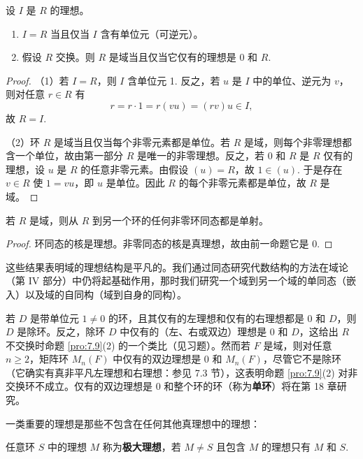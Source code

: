 \begin{proposition}\label{pro:7.9}
设 \(I\) 是 \(R\) 的理想。

\begin{enumerate}[label=(\arabic*)]
\item \(I = R\) 当且仅当 \(I\) 含有单位元（可逆元）。
\item 假设 \(R\) 交换。则 \(R\) 是域当且仅当它仅有的理想是 0 和 \(R\).
\end{enumerate}
\end{proposition}

\begin{proof}
（1）若 \(I = R\)，则 \(I\) 含单位元 1. 反之，若 \(u\) 是 \(I\) 中的单位、逆元为 \(v\)，则对任意 \(r \in R\) 有
\[
r = r\cdot 1 = r(vu) = (rv)u \in I,
\]
故 \(R = I\).

（2）环 \(R\) 是域当且仅当每个非零元素都是单位。若 \(R\) 是域，则每个非零理想都含一个单位，故由第一部分 \(R\) 是唯一的非零理想。反之，若 0 和 \(R\) 是 \(R\) 仅有的理想，设 \(u\) 是 \(R\) 的任意非零元素。由假设 \((u) = R\)，故 \(1 \in (u)\). 于是存在 \(v \in R\) 使 \(1 = vu\)，即 \(u\) 是单位。因此 \(R\) 的每个非零元素都是单位，故 \(R\) 是域。
\end{proof}

\begin{corollary}\label{cor:7.10}
若 \(R\) 是域，则从 \(R\) 到另一个环的任何非零环同态都是单射。
\end{corollary}

\begin{proof}
环同态的核是理想。非零同态的核是真理想，故由前一命题它是 0.
\end{proof}

这些结果表明域的理想结构是平凡的。我们通过同态研究代数结构的方法在域论（第 IV 部分）中仍将起基础作用，那时我们研究一个域到另一个域的单同态（嵌入）以及域的自同构（域到自身的同构）。

若 \(D\) 是带单位元 \(1 \neq 0\) 的环，且其仅有的左理想和仅有的右理想都是 0 和 \(D\)，则 \(D\) 是除环。反之，除环 \(D\) 中仅有的（左、右或双边）理想是 0 和 \(D\)，这给出 \(R\) 不交换时命题 \ref{pro:7.9}(2) 的一个类比（见习题）。然而若 \(F\) 是域，则对任意 \(n \geq 2\)，矩阵环 \(M_n(F)\) 中仅有的双边理想是 0 和 \(M_n(F)\)，尽管它不是除环（它确实有真非平凡左理想和右理想：参见 7.3 节），这表明命题 \ref{pro:7.9}(2) 对非交换环不成立。仅有的双边理想是 0 和整个环的环（称为\textbf{单环}）将在第 18 章研究。

一类重要的理想是那些不包含在任何其他真理想中的理想：

\begin{definition}
任意环 \(S\) 中的理想 \(M\) 称为\textbf{极大理想}，若 \(M \neq S\) 且包含 \(M\) 的理想只有 \(M\) 和 \(S\).
\end{definition}

